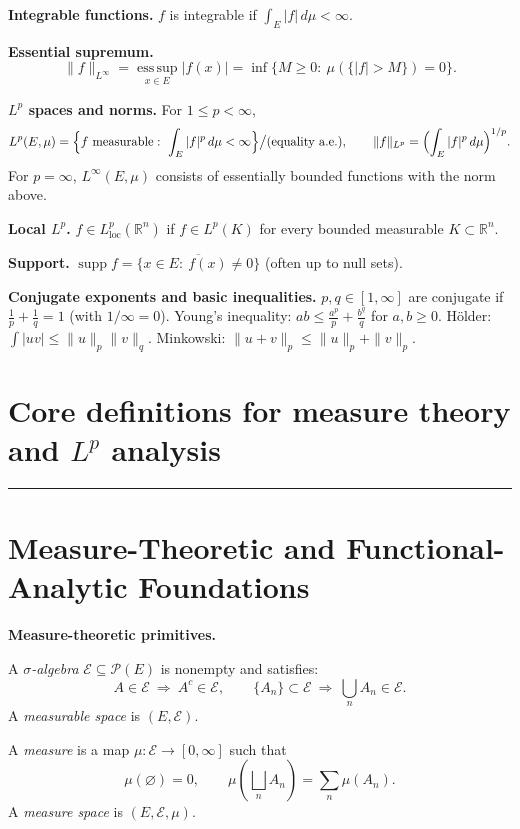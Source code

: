 \documentclass[12pt,a4paper]{article}
\theoremstyle{plain}
\theoremstyle{definition}
\theoremstyle{remark}
\theoremstyle{remark}
\newcommand{\tighthrule}{\vspace{0.6\baselineskip}\hrule\vspace{0.8\baselineskip}}
\newenvironment{spacy}{\begingroup\setlength{\parskip}{6pt}\setlength{\parindent}{0pt}}{\endgroup}
\theoremstyle{definition}
\begin{document}
\begin{spacy}
	\textbf{Integrable functions.}
	$f$ is integrable if $\int_E |f|\,d\mu<\infty$.
	
	\textbf{Essential supremum.}
	\[
	\|f\|_{L^{\infty}}=\operatorname*{ess\,sup}_{x\in E} |f(x)|
	= \inf\{M\ge0:\ \mu(\{|f|>M\})=0\}.
	\]
	
	\textbf{$L^p$ spaces and norms.}
	For $1\le p<\infty$,
	\[
	L^{p}(E,\mu)=\Bigl\{ f\ \text{measurable}:\ \int_E |f|^{p}\,d\mu<\infty \Bigr\}\big/\text{(equality a.e.)},
	\qquad \|f\|_{L^{p}}=\Bigl(\int_E |f|^{p}\,d\mu\Bigr)^{1/p}.
	\]
	For $p=\infty$, $L^{\infty}(E,\mu)$ consists of essentially bounded functions with the norm above.
	
	\textbf{Local $L^p$.}
	$f\in L^{p}_{\mathrm{loc}}(\mathbb R^{n})$ if $f\in L^{p}(K)$ for every bounded measurable $K\subset\mathbb R^{n}$.
	
	\textbf{Support.}
	$\operatorname{supp} f=\overline{\{x\in E:\ f(x)\neq 0\}}$ (often up to null sets).
	
	\textbf{Conjugate exponents and basic inequalities.}
	$p,q\in[1,\infty]$ are conjugate if $\frac1p+\frac1q=1$ (with $1/\infty=0$).
	Young’s inequality: $ab\le \frac{a^{p}}{p}+\frac{b^{q}}{q}$ for $a,b\ge0$.
	Hölder: $\int|uv|\le \|u\|_{p}\|v\|_{q}$.
	Minkowski: $\|u+v\|_{p}\le \|u\|_{p}+\|v\|_{p}$.
\end{spacy}
	
	\section*{Core definitions for measure theory and $L^p$ analysis}
	
	\tighthrule
\section*{Measure-Theoretic and Functional-Analytic Foundations}

\bigskip
\textbf{Measure-theoretic primitives.}

A \emph{$\sigma$-algebra} $\mathcal{E}\subseteq \mathcal{P}(E)$ is nonempty and satisfies:
\[
A\in\mathcal{E}\ \Rightarrow\ A^c\in\mathcal{E}, \qquad 
\{A_n\}\subset\mathcal{E}\ \Rightarrow\ \bigcup_n A_n\in\mathcal{E}.
\]
A \emph{measurable space} is $(E,\mathcal{E})$.

\medskip
A \emph{measure} is a map $\mu:\mathcal{E}\to[0,\infty]$ such that
\[
\mu(\varnothing)=0,\qquad 
\mu\!\left(\bigsqcup_n A_n\right)=\sum_n \mu(A_n).
\]
A \emph{measure space} is $(E,\mathcal{E},\mu)$.
\end{document}
